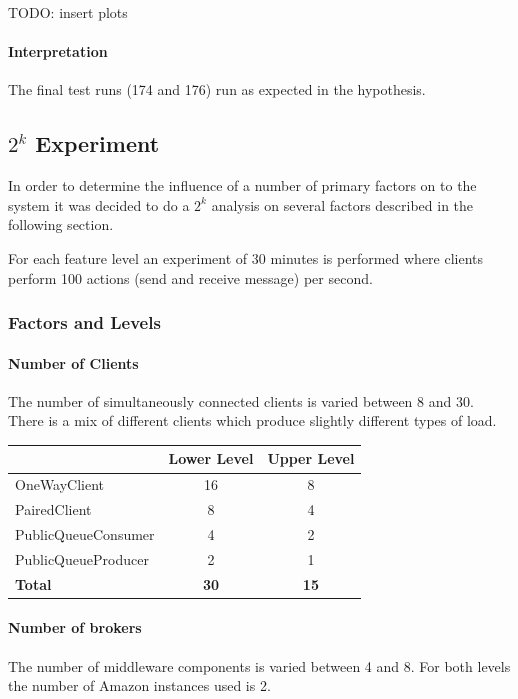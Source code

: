 \documentclass[milestone1.tex]{subfiles}
\begin{document}
TODO: insert plots

\paragraph{Interpretation}
The final test runs (174 and 176) run as expected in the hypothesis.

\subsection{$2^k$ Experiment}
In order to determine the influence of a number of primary factors on to the system it was decided to do a $2^k$ analysis on several factors described in the following section.

For each feature level an experiment of 30 minutes is performed where clients perform 100 actions (send and receive message) per second.

\subsubsection{Factors and Levels}

\paragraph{Number of Clients}
The number of simultaneously connected clients is varied between 8 and 30. There is a mix of different clients which produce slightly different types of load.

\begin{tabular}{|l|c|c|}
\hline 
 & Lower Level & Upper Level \\ 
\hline 
OneWayClient & 16 & 8  \\ 
\hline 
PairedClient & 8 & 4 \\ 
\hline 
PublicQueueConsumer & 4 & 2 \\ 
\hline 
PublicQueueProducer & 2 & 1 \\ 
\hline 
\textbf{Total}  & \textbf{30} & \textbf{15} \\
\hline 
\end{tabular} 

\paragraph{Number of brokers}

The number of middleware components is varied between 4 and 8. For both levels the number of Amazon instances used is 2.
\end{document}
